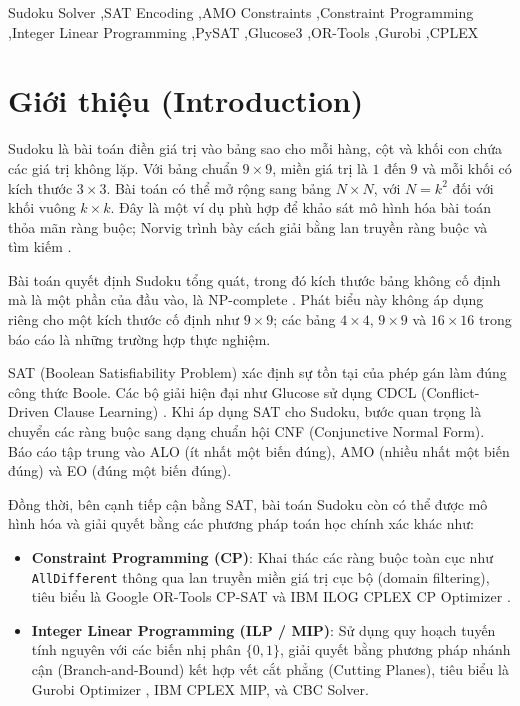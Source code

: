\documentclass[a4paper,fleqn,nologo]{cas-sc}
\begin{document}
\begin{keywords}
Sudoku Solver \sep SAT Encoding \sep AMO Constraints \sep Constraint Programming \sep Integer Linear Programming \sep PySAT \sep Glucose3 \sep OR-Tools \sep Gurobi \sep CPLEX
\end{keywords}

\maketitle

\section{Giới thiệu (Introduction)}
Sudoku là bài toán điền giá trị vào bảng sao cho mỗi hàng, cột và khối con chứa các giá trị không lặp. Với bảng chuẩn $9\times9$, miền giá trị là $1$ đến $9$ và mỗi khối có kích thước $3\times3$. Bài toán có thể mở rộng sang bảng $N\times N$, với $N=k^2$ đối với khối vuông $k\times k$. Đây là một ví dụ phù hợp để khảo sát mô hình hóa bài toán thỏa mãn ràng buộc; Norvig trình bày cách giải bằng lan truyền ràng buộc và tìm kiếm \cite{norvig2006solving}.

Bài toán quyết định Sudoku tổng quát, trong đó kích thước bảng không cố định mà là một phần của đầu vào, là NP-complete \cite{yato2003complexity}. Phát biểu này không áp dụng riêng cho một kích thước cố định như $9\times9$; các bảng $4\times4$, $9\times9$ và $16\times16$ trong báo cáo là những trường hợp thực nghiệm.

SAT (Boolean Satisfiability Problem) xác định sự tồn tại của phép gán làm đúng công thức Boole. Các bộ giải hiện đại như Glucose sử dụng CDCL (Conflict-Driven Clause Learning) \cite{audemard2009predicting}. Khi áp dụng SAT cho Sudoku, bước quan trọng là chuyển các ràng buộc sang dạng chuẩn hội CNF (Conjunctive Normal Form). Báo cáo tập trung vào ALO (ít nhất một biến đúng), AMO (nhiều nhất một biến đúng) và EO (đúng một biến đúng).

Đồng thời, bên cạnh tiếp cận bằng SAT, bài toán Sudoku còn có thể được mô hình hóa và giải quyết bằng các phương pháp toán học chính xác khác như:
\begin{itemize}
    \item \textbf{Constraint Programming (CP)}: Khai thác các ràng buộc toàn cục như \texttt{AllDifferent} thông qua lan truyền miền giá trị cục bộ (domain filtering), tiêu biểu là Google OR-Tools CP-SAT \cite{perron2024ortools} và IBM ILOG CPLEX CP Optimizer \cite{cplex2024manual}.
    \item \textbf{Integer Linear Programming (ILP / MIP)}: Sử dụng quy hoạch tuyến tính nguyên với các biến nhị phân $\{0, 1\}$, giải quyết bằng phương pháp nhánh cận (Branch-and-Bound) kết hợp vết cắt phẳng (Cutting Planes), tiêu biểu là Gurobi Optimizer \cite{gurobi2024optimizer}, IBM CPLEX MIP, và CBC Solver.
\end{itemize}
\end{document}
